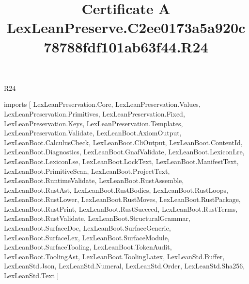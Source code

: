\begin{lexlean}{R24}
\title{Certificate A LexLeanPreserve.C2ee0173a5a920c78788fdf101ab63f44.R24}
\begin{coremodule}
imports [
  LexLeanPreservation.Core,
  LexLeanPreservation.Values,
  LexLeanPreservation.Primitives,
  LexLeanPreservation.Fixed,
  LexLeanPreservation.Keys,
  LexLeanPreservation.Templates,
  LexLeanPreservation.Validate,
  LexLeanBoot.AxiomOutput,
  LexLeanBoot.CalculusCheck,
  LexLeanBoot.CliOutput,
  LexLeanBoot.ContentId,
  LexLeanBoot.Diagnostics,
  LexLeanBoot.GnafValidate,
  LexLeanBoot.LexiconLre,
  LexLeanBoot.LexiconLse,
  LexLeanBoot.LockText,
  LexLeanBoot.ManifestText,
  LexLeanBoot.PrimitiveScan,
  LexLeanBoot.ProjectText,
  LexLeanBoot.RuntimeValidate,
  LexLeanBoot.RustAssemble,
  LexLeanBoot.RustAst,
  LexLeanBoot.RustBodies,
  LexLeanBoot.RustLoops,
  LexLeanBoot.RustLower,
  LexLeanBoot.RustMoves,
  LexLeanBoot.RustPackage,
  LexLeanBoot.RustPrint,
  LexLeanBoot.RustSucceed,
  LexLeanBoot.RustTerms,
  LexLeanBoot.RustValidate,
  LexLeanBoot.StructuralGrammar,
  LexLeanBoot.SurfaceDoc,
  LexLeanBoot.SurfaceGeneric,
  LexLeanBoot.SurfaceLex,
  LexLeanBoot.SurfaceModule,
  LexLeanBoot.SurfaceTooling,
  LexLeanBoot.TokenAudit,
  LexLeanBoot.ToolingAst,
  LexLeanBoot.ToolingLatex,
  LexLeanStd.Buffer,
  LexLeanStd.Json,
  LexLeanStd.Numeral,
  LexLeanStd.Order,
  LexLeanStd.Sha256,
  LexLeanStd.Text
]


\end{coremodule}
\end{lexlean}
